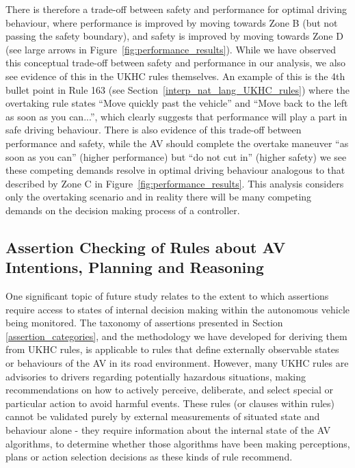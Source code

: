 There is therefore a trade-off between safety and performance for optimal driving behaviour, where performance is improved by moving towards Zone B (but not passing the safety boundary), and safety is improved by moving towards Zone D (see large arrows in Figure~\ref{fig:performance_results}). While we have observed this conceptual trade-off between safety and performance in our analysis, we also see evidence of this in the UKHC rules themselves. An example of this is the 4th bullet point in Rule 163 (see Section~\ref{interp_nat_lang_UKHC_rules}) where the overtaking rule states ``Move quickly past the vehicle'' and ``Move back to the left as soon as you can...'', which clearly suggests that performance will play a part in safe driving behaviour. There is also evidence of this trade-off between performance and safety, while the AV should complete the overtake maneuver ``as soon as you can'' (higher performance) but ``do not cut in'' (higher safety) we see these competing demands resolve in optimal driving behaviour analogous to that described by Zone C in Figure~\ref{fig:performance_results}. This analysis considers only the overtaking scenario and in reality there will be many competing demands on the decision making process of a controller. 





\subsection{Assertion Checking of Rules about AV Intentions, Planning and Reasoning}


One significant topic of future study relates to the extent to which assertions require access to states of internal decision making within the autonomous vehicle being monitored. The taxonomy of assertions presented in Section \ref{assertion_categories}, and the methodology we have developed for deriving them from UKHC rules, is applicable to rules that define externally observable states or behaviours of the AV in its road environment. However, many UKHC rules are advisories to drivers %
regarding potentially hazardous situations, making recommendations on how to actively perceive, deliberate, and select special or particular action to avoid harmful events. These rules (or clauses within rules) cannot be validated purely by external measurements of situated state and behaviour alone - they require information about the internal state of the AV algorithms, to determine whether those algorithms have been making perceptions, plans or action selection decisions as these kinds of rule recommend.

